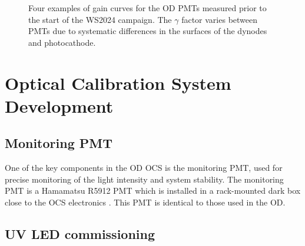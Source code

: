\begin{figure}[ht!]
\begin{subfigure}[b]{0.47\textwidth}
     \end{subfigure}
        \caption{Four examples of gain curves for the OD PMTs measured prior to the start of the WS2024 campaign. The $\gamma$ factor varies between PMTs due to systematic differences in the surfaces of the dynodes and photocathode.}
        \label{fig:gainCurve}
\end{figure}

\section{Optical Calibration System Development}
\subsection{Monitoring PMT}
One of the key components in the OD OCS is the monitoring PMT, used for precise monitoring of the light intensity and system stability. The monitoring PMT is a Hamamatsu R5912 PMT which is installed in a rack-mounted dark box close to the OCS electronics \cite{Turner:2021qvi}. This PMT is identical to those used in the OD. 

\subsection{UV LED commissioning}